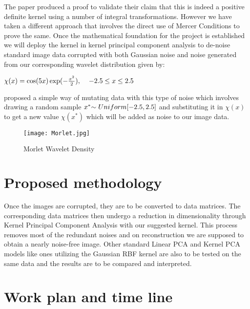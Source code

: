 \documentclass[11pt, oneside]{article}   	%
\begin{document}
The paper produced a proof to validate their claim that this is indeed a positive definite kernel using a number of integral transformations. However we have taken a different approach that involves the direct use of Mercer Conditions to prove the same. Once the mathematical foundation for the project is established we will deploy the kernel in kernel principal component analysis to de-noise standard image data corrupted with both Gaussian noise and noise generated from our corresponding wavelet distribution given by: 

\vspace{0.2cm}

\begin{center}
$\chi(x) = \cos(5x)\exp(-\frac{x^2}{2}), \hspace{0.4cm} -2.5 \le x \le 2.5$
\end{center}

\cite{MO} proposed a simple way of mutating data with this type of noise which involves drawing a random sample $x^* \mathtt{\sim} \hspace{0.1cm} Uniform[-2.5,2.5]$ and substituting it in $\chi(x)$ to get a new value $\chi(x^*)$ which will be added as noise to our image data.  

\begin{figure}[h]
    \centering
    \texttt{[image: Morlet.jpg]}
    \caption{Morlet Wavelet Density}
    \label{fig:mesh1}
\end{figure}


\section{Proposed methodology}

Once the images are corrupted, they are to be converted to data matrices. The corresponding data matrices then undergo a reduction in dimensionality through Kernel Principal Component Analysis with our suggested kernel. This process removes most of the redundant noises and on reconstruction we are supposed to obtain a nearly noise-free image. Other standard Linear PCA and Kernel PCA models like ones utilizing the Gaussian RBF kernel are also to be tested on the same data and the results are to be compared and interpreted. 

\section{Work plan and time line}
\end{document}
